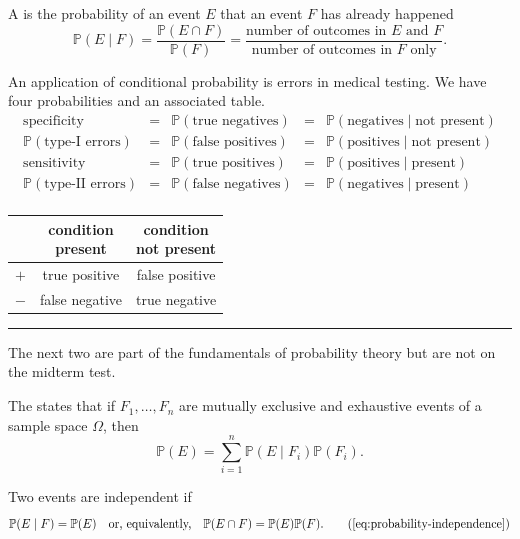 \documentclass[../main.tex]{subfiles}
\begin{document}
A  is the probability of an event \(E\)  that an event \(F\) has already happened 
\begin{equation}
  \mathbb{P}(E \mid F) = \frac{\mathbb{P}(E \cap F)}{\mathbb{P}(F)} = \frac{\text{number of outcomes in \(E\) and \(F\)}}{\text{number of outcomes in \(F\) only}}.
\end{equation}

An application of conditional probability is errors in medical testing. We have four probabilities and an associated table.
\[
  \begin{array}{cclcl}
    \text{specificity} 
  &=& \mathbb{P}(\text{true negatives}) 
  &=& \mathbb{P}( \text{negatives} \mid \text{not present} ) \\
  \mathbb{P}(\text{type-I errors})
  &=& \mathbb{P}(\text{false positives}) 
  &=& \mathbb{P}( \text{positives} \mid \text{not present} ) \\
    \text{sensitivity} 
  &=& \mathbb{P}(\text{true positives}) 
  &=& \mathbb{P}( \text{positives} \mid \text{present} ) \\
  \mathbb{P}(\text{type-II errors})
  &=& \mathbb{P}(\text{false negatives})
  &=& \mathbb{P}( \text{negatives} \mid \text{present} ) \\
  \end{array}
\]

\begin{center}
  \begin{tabular}{c||c|c}
      & \parbox{1.25in}{\centering condition\\present} & \parbox{1.25in}{\centering condition\\not present} \\\midrule\midrule
    \(+\) &   true positive    & false positive \\[2ex]\midrule
    \(-\) &   false negative   & true negative \\[2ex]
  \end{tabular}
\end{center}

\medskip
\hrule

The next two are part of the fundamentals of probability theory but are not  on the midterm test.

The  states that if \(F_{1}, \ldots, F_{n}\) are mutually exclusive and exhaustive events of a sample space \(\Omega\), then 
\begin{equation}
  \mathbb{P}(E) = \sum_{i=1}^{n} \mathbb{P}(E \mid F_{i}) \mathbb{P}(F_{i}).
\end{equation}

Two events are independent if 
\begin{equation}
  \mathbb{P}(E \mid F) = \mathbb{P}(E)
  \quad\text{or, equivalently,}\quad
  \mathbb{P}(E \cap F) = \mathbb{P}(E) \mathbb{P}(F).
  \tag{\ref{eq:probability-independence}}
\end{equation}
\end{document}

